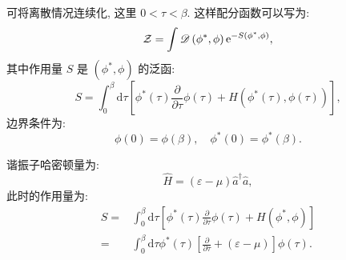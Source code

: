 可将离散情况连续化, 这里 $0<\tau<\beta$. 这样配分函数可以写为:
\begin{equation}
\mathcal{Z}=\int \mathscr{D}\left(\phi^{*}, \phi\right) \mathrm{e}^{-S\left(\phi^{*}, \phi\right)},
\end{equation}
其中作用量 $S$ 是 $\left(\phi^{*}, \phi\right)$ 的泛函:
\begin{equation}
S=\int_{0}^{\beta} \mathrm{d} \tau\left[\phi^{*}(\tau) \frac{\partial}{\partial \tau} \phi(\tau)+H\left(\phi^{*}(\tau), {\phi}(\tau)\right)\right],
\end{equation}
边界条件为:
\begin{equation}
\phi(0)=\phi(\beta), \quad \phi^{*}(0)=\phi^{*}(\beta).
\end{equation}

\begin{example}谐振子哈密顿量为:
\begin{equation}
\hat{H}=(\varepsilon-\mu) \hat{a}^{\dagger} \hat{a},
\end{equation}
此时的作用量为:
\begin{align}
S=&\int_{0}^{\beta} \mathrm{d} \tau\left[\phi^{*}(\tau) \frac{\partial}{\partial \tau} \phi(\tau)+H\left(\phi^{*}, {\phi}\right)\right]\nonumber\\
=&\int_{0}^{\beta} \mathrm{d} \tau \phi^{*}(\tau)\left[\frac{\partial}{\partial \tau}+(\varepsilon-\mu)\right] \phi(\tau) .
\end{align}
\end{example}

